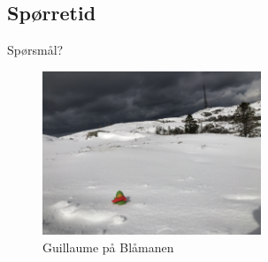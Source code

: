 \subsection*{Spørretid}
\begin{frame}{Spørsmål?}
    \begin{figure}
        \centering
        \includegraphics[height = 4.9cm]{images/guillaume7.jpg}
        \caption{Guillaume på Blåmanen}
        \label{fig:guillaume7a}
    \end{figure}
\end{frame}

